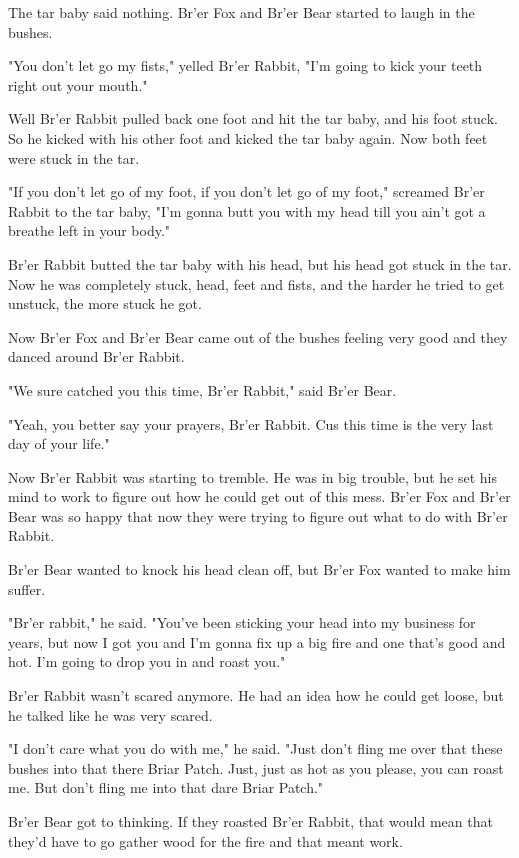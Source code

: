 The tar baby said nothing. Br'er Fox and Br'er Bear started to laugh in the bushes.

"You don't let go my fists," yelled Br'er Rabbit, "I'm going to kick your teeth right out your mouth."

Well Br'er Rabbit pulled back one foot and hit the tar baby, and his foot stuck. So he kicked with his other foot and kicked the tar baby again. Now both feet were stuck in the tar.

"If you don't let go of my foot, if you don't let go of my foot," screamed Br'er Rabbit to the tar baby, "I'm gonna butt you with my head till you ain't got a breathe left in your body."

Br'er Rabbit butted the tar baby with his head, but his head got stuck in the tar. Now he was completely stuck, head, feet and fists, and the harder he tried to get unstuck, the more stuck he got.

Now Br'er Fox and Br'er Bear came out of the bushes feeling very good and they danced around Br'er Rabbit.

"We sure catched you this time, Br'er Rabbit," said Br'er Bear.

"Yeah, you better say your prayers, Br'er Rabbit. Cus this time is the very last day of your life."

Now Br'er Rabbit was starting to tremble. He was in big trouble, but he set his mind to work to figure out how he could get out of this mess. Br'er Fox and Br'er Bear was so happy that now they were trying to figure out what to do with Br'er Rabbit.

Br'er Bear wanted to knock his head clean off, but Br'er Fox wanted to make him suffer.

"Br'er rabbit," he said. "You've been sticking your head into my business for years, but now I got you and I'm gonna fix up a big fire and one that's good and hot. I'm going to drop you in and roast you."

Br'er Rabbit wasn't scared anymore. He had an idea how he could get loose, but he talked like he was very scared.

"I don't care what you do with me," he said. "Just don't fling me over that these bushes into that there Briar Patch. Just, just as hot as you please, you can roast me. But don't fling me into that dare Briar Patch."

Br'er Bear got to thinking. If they roasted Br'er Rabbit, that would mean that they'd have to go gather wood for the fire and that meant work.

